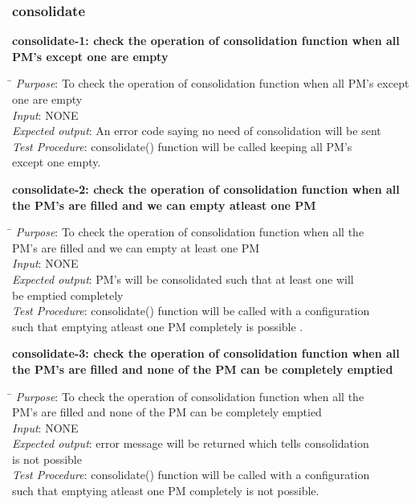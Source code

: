 \documentclass[a4paper,10pt]{article}
\begin{document}
\subsubsection{consolidate}
\textbf{consolidate-1: check the operation of consolidation function when all PM's except one are empty }
\begin{tabbing}
  \hspace*{4cm}\= \kill
\emph{Purpose}\>: To check the operation of consolidation function when all PM's except one are empty\\
\emph{Input}\>: NONE\\
\emph{Expected output}\>: An error code saying no need of consolidation will be sent \\
\emph{Test Procedure}\>: consolidate() function will be called keeping all PM's\\ \> except one empty.\\
\end{tabbing}
\textbf{consolidate-2: check the operation of consolidation function when all the PM's are filled and we can empty atleast one PM}
\begin{tabbing}
  \hspace*{4cm}\= \kill
\emph{Purpose}\>: To check the operation of consolidation function when all the\\ \> PM's are filled and we can empty at least one PM\\
\emph{Input}\>: NONE\\
\emph{Expected output}\>: PM's will be  consolidated such that at least one will\\ \> be emptied completely\\
\emph{Test Procedure}\>: consolidate() function will be called with a configuration\\ \> such that emptying atleast one PM completely is possible .\\
\end{tabbing}
\textbf{consolidate-3: check the operation of consolidation function when all the PM's are filled and none of the PM can be completely emptied}
\begin{tabbing}
  \hspace*{4cm}\= \kill
\emph{Purpose}\>: To check the operation of consolidation function when all the\\ \> PM's are filled and none of the PM can be completely emptied\\
\emph{Input}\>: NONE\\
\emph{Expected output}\>: error message will be returned which tells consolidation\\ \> is not possible\\
\emph{Test Procedure}\>: consolidate() function will be called with a configuration\\ \> such that emptying atleast one PM completely is not possible.\\
\end{tabbing}
\end{document}
